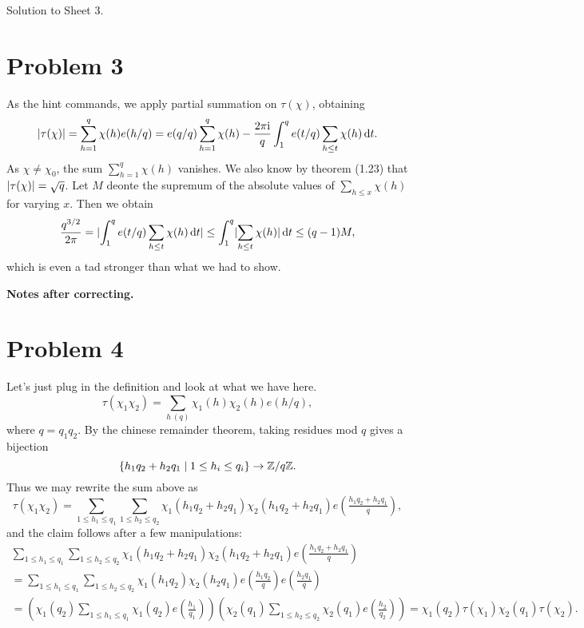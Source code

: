 \documentclass[a4paper,11pt]{article}
\begin{document}
\begin{center}
    \huge{ Solution to Sheet 3. }
\end{center}

\section*{Problem 3}
As the hint commands, we apply partial summation on $\tau(\chi)$, obtaining
\[
    \lvert \tau(\chi) \rvert = \sum_{h=1}^q \chi(h) e(h/q) = e(q/q) \sum_{h=1}^q
    \chi(h) - \frac{2\pi \mathrm i}{q} \int_1^q e(t/q) \sum_{h \leq t} \chi(h) 
    \mathrm{\,d} t.
\]
As $\chi \neq \chi_0$, the sum $\sum_{h=1}^q \chi(h)$ vanishes. We also
know by theorem (1.23) that $\lvert \tau(\chi) \rvert = \sqrt q$. 
Let $M$ deonte the supremum of the absolute values of $\sum_{h \leq x}
\chi(h)$ for varying $x$. Then we obtain
\[
    \frac{q^{3/2}}{2 \pi} = \lvert \int_1^q e(t/q) \sum_{h \leq t} \chi(h) \mathrm{\,d} t \rvert \leq \int_1^q \lvert  \sum_{h \leq t}  \chi(h)  \rvert \mathrm{\,d} t \leq (q-1)M,
\]
which is even a tad stronger than what we had to show. 

\textbf{Notes after correcting.} \leavevmode

\section*{Problem 4}
Let's just plug in the definition and look at what we have here.
\[
    \tau(\chi_1 \chi_2) = \sum_{h \ (q)} \chi_1(h) \chi_2(h) e(h/q),
\]
where $q = q_1 q_2$. By the chinese remainder theorem, taking residues mod $q$ gives
a bijection
\[
    \{h_1 q_2 + h_2 q_1 \mid 1 \leq h_i \leq q_i\} \to \mathbb{Z}/q\mathbb{Z}.
\]
Thus we may rewrite the sum above as 
\[
    \tau(\chi_1 \chi_2) = \sum_{1 \leq h_1 \leq q_1} \sum_{1 \leq h_2 \leq q_2}\chi_1(h_1q_2 + h_2q_1) \chi_2(h_1q_2 + h_2 q_1) e(\tfrac{h_1q_2+h_2q_1}q),
\]
and the claim follows after a few manipulations:
\begin{multline*}
     \sum_{1 \leq h_1 \leq q_1} \sum_{1 \leq h_2 \leq q_2}\chi_1(h_1q_2 + h_2q_1) \chi_2(h_1q_2
     + h_2 q_1) e(\tfrac{h_1q_2+h_2q_1}q) \\
     = \sum_{1 \leq h_1 \leq q_1} \sum_{1 \leq h_2 \leq q_2}\chi_1(h_1q_2) \chi_2(h_2 q_1)
     e(\tfrac{h_1q_2}q) e(\tfrac{h_2q_1}q) \\ 
     = \left(\chi_1(q_2)\sum_{1 \leq h_1 \leq q_1}
     \chi_1(q_2)e(\tfrac{h_1}{q_1})\right) \left(\chi_2(q_1)\sum_{1 \leq h_2 \leq q_2}
     \chi_2(q_1)e(\tfrac{h_2}{q_2})\right) = \chi_1(q_2)\tau(\chi_1) \chi_2(q_1)\tau(\chi_2).
\end{multline*}
\end{document}

